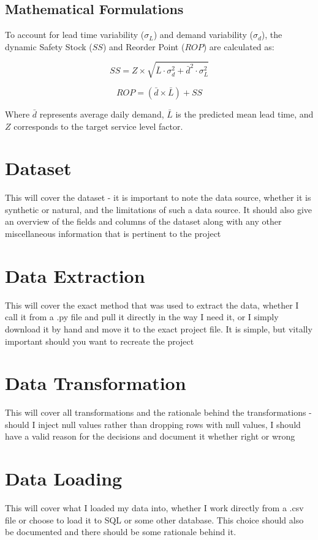 \documentclass[runningheads]{llncs}
\begin{document}
\subsection{Mathematical Formulations}
To account for lead time variability ($\sigma_L$) and demand variability ($\sigma_d$), the dynamic Safety Stock ($SS$) and Reorder Point ($ROP$) are calculated as:

\begin{equation}
    SS = Z \times \sqrt{\bar{L} \cdot \sigma_d^2 + \bar{d}^2 \cdot \sigma_L^2}
\end{equation}

\begin{equation}
    ROP = (\bar{d} \times \bar{L}) + SS
\end{equation}

Where $\bar{d}$ represents average daily demand, $\bar{L}$ is the predicted mean lead time, and $Z$ corresponds to the target service level factor.

\section{Dataset}
This will cover the dataset - it is important to note the data source, whether it is synthetic or natural, and the limitations of such a data source. It should also give an overview of the fields and columns of the dataset along with any other miscellaneous information that is pertinent to the project

\section{Data Extraction}
This will cover the exact method that was used to extract the data, whether I call it from a .py file and pull it directly in the way I need it, or I simply download it by hand and move it to the exact project file. It is simple, but vitally important should you want to recreate the project

\section{Data Transformation}
This will cover all transformations and the rationale behind the transformations - should I inject null values rather than dropping rows with null values, I should have a valid reason for the decisions and document it whether right or wrong

\section{Data Loading}
This will cover what I loaded my data into, whether I work directly from a .csv file or choose to load it to SQL or some other database. This choice should also be documented and there should be some rationale behind it.
\end{document}
